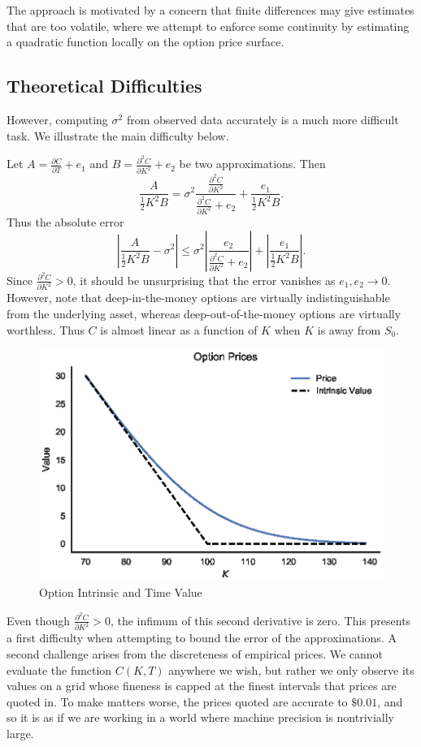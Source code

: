 \documentclass[11pt]{article}
\numberwithin{equation}{section}
\newcommand{\diff}[2]{\frac{\partial #1}{\partial #2}}
\newcommand{\abs}[1]{\left|#1\right|}
\begin{document}
The approach is motivated by a concern that finite differences may give estimates that are too volatile, where we attempt to enforce some continuity by estimating a quadratic function locally on the option price surface.


\subsection{Theoretical Difficulties}
However, computing $\sigma^2$ from observed data accurately is a much more
difficult task. We illustrate the main difficulty below.

Let $A = \diff{C}{T} + e_1$ and $B = \diff{^2C}{K^2} + e_2$ be two
approximations. Then \[ \frac{A}{\frac{1}{2}K^2 B} = \sigma^2
\frac{\diff{^2C}{K^2}}{\diff{^2C}{K^2} + e_2} + \frac{e_1}{\frac{1}{2}K^2 B}.
\]
Thus the absolute error \[
\abs{\frac{A}{\frac{1}{2}K^2 B} - \sigma^2} \le \sigma^2
\abs{\frac{e_2}{\diff{^2C}{K^2}+e_2}} + \abs{\frac{e_1}{\frac{1}{2}K^2B}}.
\]
Since $\diff{^2C}{K^2} > 0$, it should be unsurprising that the error vanishes
as $e_1,e_2 \to 0$. However, note that deep-in-the-money options are virtually
indistinguishable from the underlying asset, whereas deep-out-of-the-money
options are virtually worthless. Thus $C$ is almost linear as a function of $K$
when $K$ is away from $S_0$.

\begin{figure}[h]
\centering
\includegraphics{figs/intrinsicvalue}
\caption{Option Intrinsic and Time Value}
\label{fig:intrinsicvalue}
\end{figure}

Even though $\diff{^2C}{K^2} > 0$, the infimum of this second derivative is
zero. This presents a first difficulty when attempting to bound the error of the
approximations. A second challenge arises from the discreteness of empirical
prices. We cannot evaluate the function $C(K,T)$ anywhere we wish, but rather we
only observe its values on a grid whose fineness is capped at the finest
intervals that prices are quoted in. To make matters worse, the prices quoted
are accurate to $\$0.01$, and so it is as if we are working in a world where
machine precision is nontrivially large.
\end{document}
